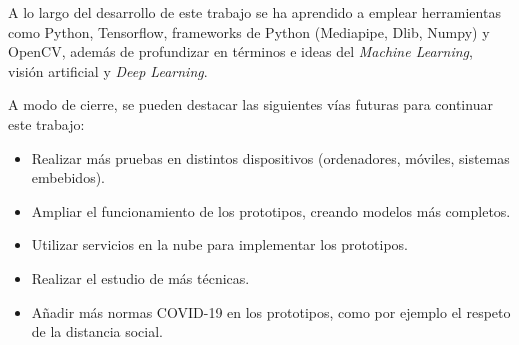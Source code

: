 A lo largo del desarrollo de este trabajo se ha aprendido a emplear herramientas como Python, Tensorflow, frameworks de Python (Mediapipe, Dlib, Numpy) y OpenCV, además de profundizar en términos e ideas del \textit{Machine Learning}, visión artificial y \textit{Deep Learning}.

A modo de cierre, se pueden destacar las siguientes vías futuras para continuar este trabajo:
\begin{itemize}
	\item Realizar más pruebas en distintos dispositivos (ordenadores, móviles, sistemas embebidos).
	\item Ampliar el funcionamiento de los prototipos, creando modelos más completos.
	\item Utilizar servicios en la nube para implementar los prototipos.
	\item Realizar el estudio de más técnicas.
	\item Añadir más normas COVID-19 en los prototipos, como por ejemplo el respeto de la distancia social.
\end{itemize}